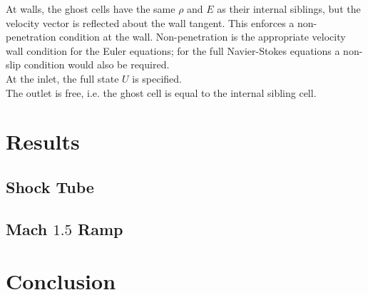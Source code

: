 \documentclass[paper=a4, fontsize=11pt]{scrartcl}
\numberwithin{equation}{section}        %
\numberwithin{figure}{section}          %
\numberwithin{table}{section}               %
\begin{document}
At walls, the ghost cells have the same $\rho$ and $E$ as their internal siblings, but the velocity vector is reflected about the wall tangent. This enforces a non-penetration condition at the wall. Non-penetration is the appropriate velocity wall condition for the Euler equations; for the full Navier-Stokes equations a non-slip condition would also be required.\\

At the inlet, the full state $U$ is specified.\\

The outlet is free, i.e. the ghost cell is equal to the internal sibling cell.\\


\section{Results}
\subsection{Shock Tube}

\subsection{Mach $1.5$ Ramp}

\section{Conclusion}
\end{document}
